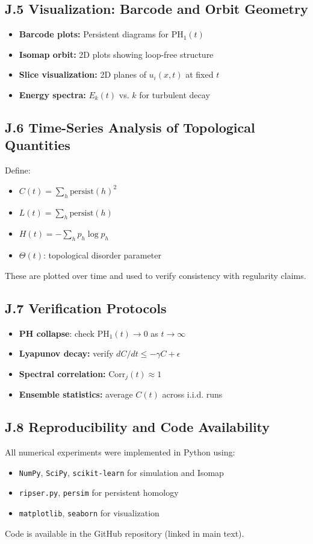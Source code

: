 \documentclass[11pt]{article}
\theoremstyle{definition}
\begin{document}
\subsection*{J.5 Visualization: Barcode and Orbit Geometry}
\begin{itemize}
  \item \textbf{Barcode plots:} Persistent diagrams for $\mathrm{PH}_1(t)$
  \item \textbf{Isomap orbit:} 2D plots showing loop-free structure
  \item \textbf{Slice visualization:} 2D planes of $u_i(x,t)$ at fixed $t$
  \item \textbf{Energy spectra:} $E_k(t)$ vs. $k$ for turbulent decay
\end{itemize}

\subsection*{J.6 Time-Series Analysis of Topological Quantities}
Define:
\begin{itemize}
  \item $C(t) = \sum_h \mathrm{persist}(h)^2$
  \item $L(t) = \sum_h \mathrm{persist}(h)$
  \item $H(t) = -\sum_h p_h \log p_h$
  \item $\Theta(t)$: topological disorder parameter
\end{itemize}
These are plotted over time and used to verify consistency with regularity claims.

\subsection*{J.7 Verification Protocols}
\begin{itemize}
  \item \textbf{PH collapse}: check $\mathrm{PH}_1(t) \to 0$ as $t \to \infty$
  \item \textbf{Lyapunov decay:} verify $dC/dt \leq -\gamma C + \epsilon$
  \item \textbf{Spectral correlation:} $\mathrm{Corr}_j(t) \approx 1$
  \item \textbf{Ensemble statistics:} average $C(t)$ across i.i.d. runs
\end{itemize}

\subsection*{J.8 Reproducibility and Code Availability}
All numerical experiments were implemented in Python using:
\begin{itemize}
  \item \texttt{NumPy}, \texttt{SciPy}, \texttt{scikit-learn} for simulation and Isomap
  \item \texttt{ripser.py}, \texttt{persim} for persistent homology
  \item \texttt{matplotlib}, \texttt{seaborn} for visualization
\end{itemize}
Code is available in the GitHub repository (linked in main text).
\end{document}

